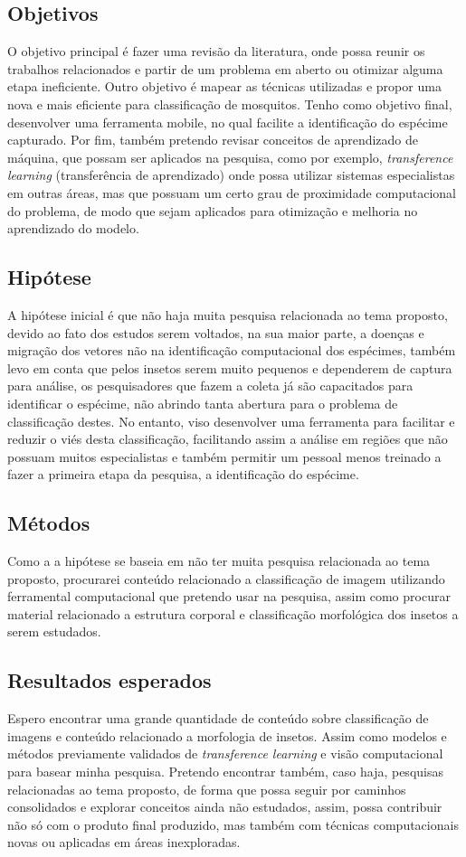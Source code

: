 \documentclass{article}
\begin{document}
\subsection{Objetivos}
O objetivo principal é fazer uma revisão da literatura, onde possa reunir os trabalhos relacionados e partir de um problema em aberto ou otimizar alguma etapa ineficiente.
Outro objetivo é mapear as técnicas utilizadas e propor uma nova e mais eficiente para classificação de mosquitos. Tenho como objetivo final, desenvolver uma ferramenta mobile, no qual facilite a identificação do espécime capturado.
Por fim, também pretendo revisar conceitos de aprendizado de máquina, que possam ser aplicados na pesquisa, como por exemplo, \emph{transference learning} (transferência de aprendizado) onde possa utilizar sistemas especialistas em outras áreas, mas que possuam um certo grau de proximidade computacional do problema, de modo que sejam aplicados para otimização e melhoria no aprendizado do modelo.

\subsection{Hipótese}
A hipótese inicial é que não haja muita pesquisa relacionada ao tema proposto, devido ao fato dos estudos serem voltados, na sua maior parte, a doenças e migração dos vetores não na identificação computacional dos espécimes, também levo em conta que pelos insetos serem muito pequenos e dependerem de captura para análise, os pesquisadores que fazem a coleta já são capacitados para identificar o espécime, não abrindo tanta abertura para o problema de classificação destes. No entanto, viso desenvolver uma ferramenta para facilitar e reduzir o viés desta classificação, facilitando assim a análise em regiões que não possuam muitos especialistas e também permitir um pessoal menos treinado a fazer a primeira etapa da pesquisa, a identificação do espécime.

\subsection{Métodos}
Como a a hipótese se baseia em não ter muita pesquisa relacionada ao tema proposto,  procurarei conteúdo relacionado a classificação de imagem utilizando ferramental computacional que pretendo usar na pesquisa, assim como procurar material relacionado a estrutura corporal e classificação morfológica dos insetos a serem estudados.

\subsection{Resultados esperados}
Espero encontrar uma grande quantidade de conteúdo sobre classificação de imagens e conteúdo relacionado a morfologia de insetos. Assim como modelos e métodos previamente validados de \emph{transference learning} e visão computacional para basear minha pesquisa. 
Pretendo encontrar também, caso haja, pesquisas relacionadas ao tema proposto, de forma que possa seguir por caminhos consolidados e explorar conceitos ainda não estudados, assim, possa contribuir não só com o produto final produzido, mas também com técnicas computacionais novas ou aplicadas em áreas inexploradas.
\end{document}
